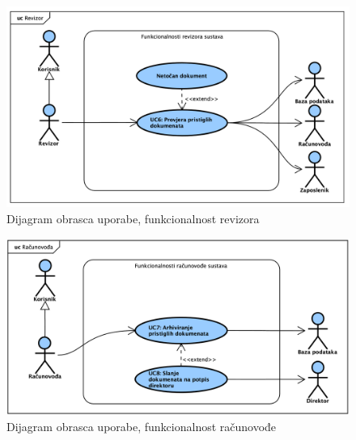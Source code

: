 					\begin{figure}[H]
						\includegraphics[width=\textwidth]{slike/UseCase_Revizor.png}
						\caption{Dijagram obrasca uporabe, funkcionalnost revizora}
						\label{fig:usecase_revizor}
					\end{figure}

					\begin{figure}[H]
						\includegraphics[width=\textwidth]{slike/UseCase_Racunovoda.png}
						\caption{Dijagram obrasca uporabe, funkcionalnost računovođe}
						\label{fig:usecase_racunovoda}
					\end{figure}

